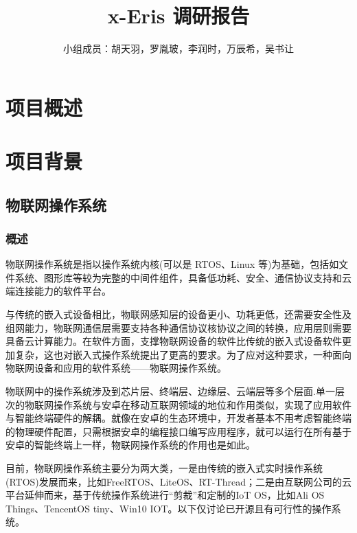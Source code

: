 \documentclass[UTF8,a4paper]{ctexart}
\title{\textbf{x-Eris 调研报告}}
\author{小组成员：胡天羽，罗胤玻，李润时，万辰希，吴书让}
\begin{document}
\maketitle

\section{项目概述}
\section{项目背景}
\subsection{物联网操作系统}
\subsubsection{概述}
物联网操作系统是指以操作系统内核(可以是 RTOS、Linux 等)为基础，包括如文件系统、图形库等较为完整的中间件组件，具备低功耗、安全、通信协议支持和云端连接能力的软件平台。

与传统的嵌入式设备相比，物联网感知层的设备更小、功耗更低，还需要安全性及组网能力，物联网通信层需要支持各种通信协议核协议之间的转换，应用层则需要具备云计算能力。在软件方面，支撑物联网设备的软件比传统的嵌入式设备软件更加复杂，这也对嵌入式操作系统提出了更高的要求。为了应对这种要求，一种面向物联网设备和应用的软件系统——物联网操作系统。

物联网中的操作系统涉及到芯片层、终端层、边缘层、云端层等多个层面.单一层次的物联网操作系统与安卓在移动互联网领域的地位和作用类似，实现了应用软件与智能终端硬件的解耦。就像在安卓的生态环境中，开发者基本不用考虑智能终端的物理硬件配置，只需根据安卓的编程接口编写应用程序，就可以运行在所有基于安卓的智能终端上一样，物联网操作系统的作用也是如此。

目前，物联网操作系统主要分为两大类，一是由传统的嵌入式实时操作系统(RTOS)发展而来，比如FreeRTOS、LiteOS、RT-Thread；二是由互联网公司的云平台延伸而来，基于传统操作系统进行“剪裁”和定制的IoT OS，比如Ali OS Things、TencentOS tiny、Win10 IOT。以下仅讨论已开源且有可行性的操作系统。
\end{document}
